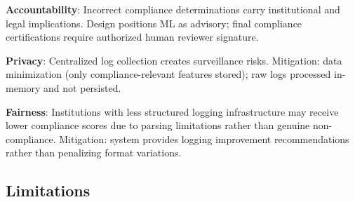 \documentclass[futureinternet,article,submit,pdftex,moreauthors]{Definitions/mdpi}
\begin{document}
\textbf{Accountability}: Incorrect compliance determinations carry institutional and legal
implications. Design positions ML as advisory; final compliance certifications require
authorized human reviewer signature.

\textbf{Privacy}: Centralized log collection creates surveillance risks. Mitigation:
data minimization (only compliance-relevant features stored); raw logs processed in-memory
and not persisted.

\textbf{Fairness}: Institutions with less structured logging infrastructure may receive lower
compliance scores due to parsing limitations rather than genuine non-compliance. Mitigation:
system provides logging improvement recommendations rather than penalizing format variations.

\subsection{Limitations}
\end{document}

